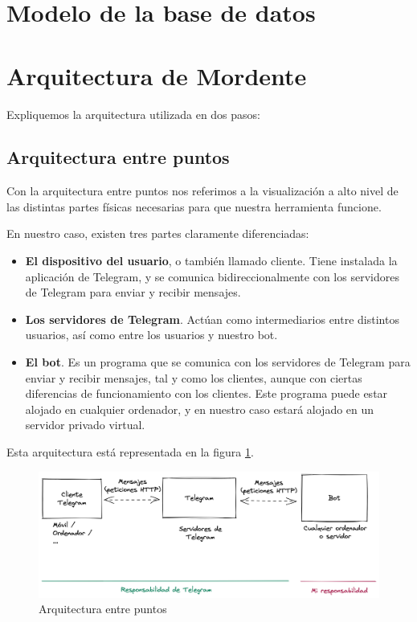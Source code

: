 \section{Modelo de la base de datos}

\section{Arquitectura de Mordente}

Expliquemos la arquitectura utilizada en dos pasos:

\subsection{Arquitectura entre puntos}

Con la arquitectura entre puntos nos referimos a la visualización a alto nivel de las distintas partes físicas necesarias para que nuestra herramienta funcione.

En nuestro caso, existen tres partes claramente diferenciadas:

\begin{itemize}
    \item \textbf{El dispositivo del usuario}, o también llamado cliente. Tiene instalada la aplicación de Telegram, y se comunica bidireccionalmente con los servidores de Telegram para enviar y recibir mensajes.
    \item \textbf{Los servidores de Telegram}. Actúan como intermediarios entre distintos usuarios, así como entre los usuarios y nuestro bot.
    \item \textbf{El bot}. Es un programa que se comunica con los servidores de Telegram para enviar y recibir mensajes, tal y como los clientes, aunque con ciertas diferencias de funcionamiento con los clientes. Este programa puede estar alojado en cualquier ordenador, y en nuestro caso estará alojado en un servidor privado virtual.
\end{itemize}

Esta arquitectura está representada en la figura \ref{fig:arquitecturaPuntos}.

\begin{figure}[h]
\centering
\includegraphics[width=1\textwidth]{imagenes/disenyo_tecnico/arquitectura_puntos.png}
\caption{Arquitectura entre puntos}
\label{fig:arquitecturaPuntos}
\end{figure}

